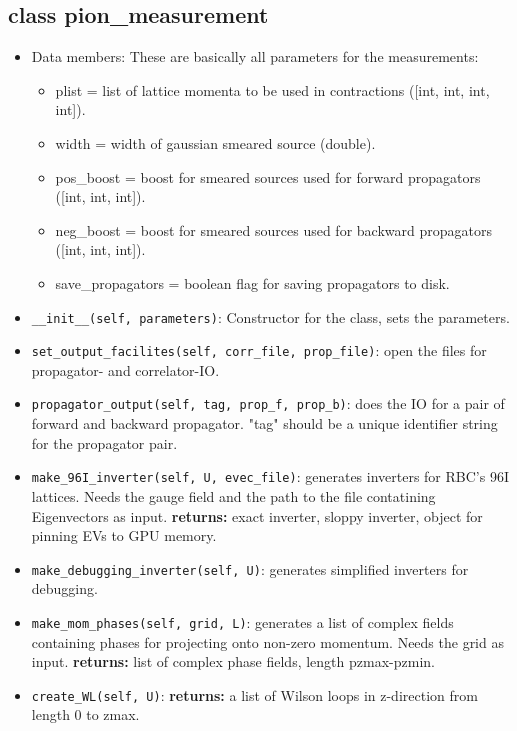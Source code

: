 \documentclass[a4paper,10pt]{scrartcl}
\begin{document}
\subsection{class pion\_measurement}
\begin{itemize}
    \item Data members: These are basically all parameters for the measurements:
        \begin{itemize}
            \item plist = list of lattice momenta to be used in contractions ([int, int, int, int]).
            \item width = width of gaussian smeared source (double).
            \item pos\_boost = boost for smeared sources used for forward propagators ([int, int, int]).
            \item neg\_boost = boost for smeared sources used for backward propagators ([int, int, int]).
            \item save\_propagators = boolean flag for saving propagators to disk.
        \end{itemize}
    \item \lstinline{__init__(self, parameters)}: Constructor for the class, sets the parameters.
    \item \lstinline{set_output_facilites(self, corr_file, prop_file)}: open the files for propagator- and
            correlator-IO.
    \item \lstinline{propagator_output(self, tag, prop_f, prop_b)}: does the IO for a pair of forward and
            backward propagator. "tag" should be a unique identifier string for the propagator pair.
    \item \lstinline{make_96I_inverter(self, U, evec_file)}: generates inverters for RBC's 96I lattices.
           Needs the gauge field and the path to the file contatining Eigenvectors as input. \newline \textbf{returns:}
           exact inverter, sloppy inverter, object for pinning EVs to GPU memory. 
    \item  \lstinline{make_debugging_inverter(self, U)}: generates simplified inverters for debugging.
    \item \lstinline{make_mom_phases(self, grid, L)}: generates a list of complex fields containing phases for
            projecting onto non-zero momentum. Needs the grid as input. \newline \textbf{returns:} list of complex phase fields, length pzmax-pzmin.
    \item \lstinline{create_WL(self, U)}: \textbf{returns:} a list of Wilson loops in z-direction from length 0 to zmax. 

\end{itemize}
\end{document}
